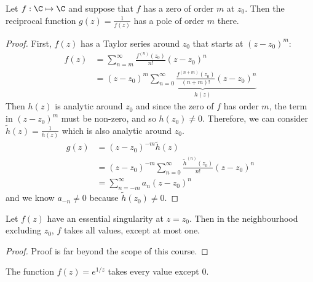 \documentclass[../Main.tex]{subfiles}
\begin{document}
\begin{proposition}
    Let $f : \C \mapsto \C$ and suppose that $f$ has a zero of order $m$ at $z_0$. Then the reciprocal function $g(z) = \frac{1}{f(z)}$ has a pole of order $m$ there.
    \label{propZeroesSingsInverse}
\end{proposition}
\begin{proof}
    First, $f(z)$ has a Taylor series around $z_0$ that starts at $(z - z_0)^m$:
    \begin{align*}
        f(z) &= \sum_{n = m}^{\infty} \frac{f^{(n)}(z_0)}{n!} (z - z_0)^n \\
        &= (z - z_0)^m \underbrace{\sum_{n=0}^{\infty} \frac{f^{(n+m)}(z_0)}{(n+m)!} (z - z_0)^n}_{h(z)}
    \end{align*}
    Then $h(z)$ is analytic around $z_0$ and since the zero of $f$ has order $m$, the term in $(z - z_0)^m$ must be non-zero, and so $h(z_0) \neq 0$. Therefore, we can consider $\tilde{h}(z) = \frac1{h(z)}$ which is also analytic around $z_0$.
    \begin{align*}
        g(z) &= (z - z_0)^{-m} \tilde{h}(z) \\
        &= (z - z_0)^{-m} \sum_{n=0}^{\infty} \frac{\tilde{h}^{(n)}(z_0)}{n!} (z - z_0)^n \\
        &= \sum_{n=-m}^{\infty} a_n (z - z_0)^n
    \end{align*}
    and we know $a_{-n} \neq 0$ because $\tilde{h}(z_0) \neq 0$.
\end{proof}
\begin{theorem}
    Let $f(z)$ have an essential singularity at $z = z_0$. Then in the neighbourhood excluding $z_0$, $f$ takes all values, except at most one.
    \label{thmGrandPicard}
\end{theorem}
\begin{proof}
    Proof is far beyond the scope of this course.
\end{proof}
\begin{remark}
    The function $f(z) = e^{1 / z}$ takes every value except $0$.
\end{remark}
\end{document}
